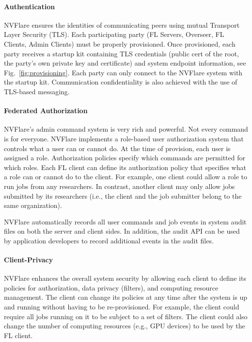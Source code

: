 \documentclass[11pt]{article}
\begin{document}
\paragraph{Authentication} NVFlare ensures the identities of communicating peers using mutual Transport Layer Security (TLS). Each participating party (FL Servers, Overseer, FL Clients, Admin Clients) must be properly provisioned. Once provisioned, each party receives a startup kit containing TLS credentials (public cert of the root, the party's own private key and certificate) and system endpoint information, see Fig.~\ref{fig:provisioning}. Each party can only connect to the NVFlare system with the startup kit.
%
Communication confidentiality is also achieved with the use of TLS-based messaging.

\paragraph{Federated Authorization} NVFlare's admin command system is very rich and powerful. Not every command is for everyone. NVFlare implements a role-based user authorization system that controls what a user can or cannot do. At the time of provision, each user is assigned a role. Authorization policies specify which commands are permitted for which roles.
Each FL client can define its authorization policy that specifies what a role can or cannot do to the client. For example, one client could allow a role to run jobs from any researchers. In contrast, another client may only allow jobs submitted by its researchers (i.e., the client and the job submitter belong to the same organization).

NVFlare automatically records all user commands and job events in system audit files on both the server and client sides. In addition, the audit API can be used by application developers to record additional events in the audit files.

\paragraph{Client-Privacy} NVFlare enhances the overall system security by allowing each client to define its policies for authorization, data privacy (filters), and computing resource management. The client can change its policies at any time after the system is up and running without having to be re-provisioned. For example, the client could require all jobs running on it to be subject to a set of filters. The client could also change the number of computing resources (e.g., GPU devices) to be used by the FL client.
\end{document}
